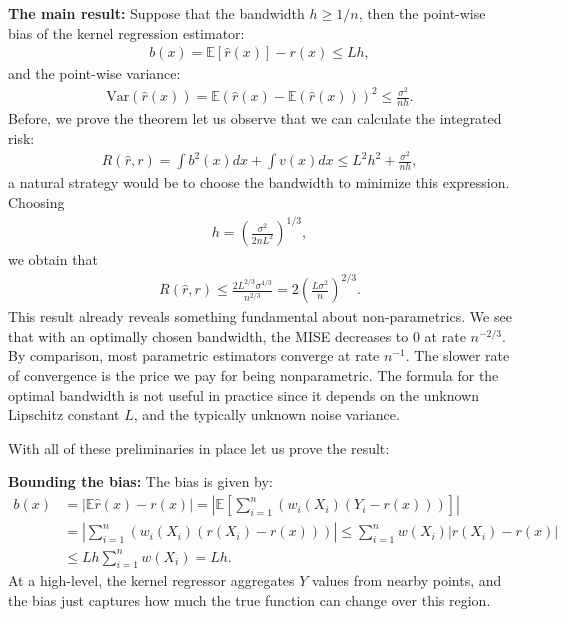 \documentclass[twoside,12pt]{article}
\begin{document}
{\bf The main result: } Suppose that the bandwidth $h \geq 1/n$, then the 
point-wise bias 
of the kernel regression estimator:
\begin{align*}
b(x) = \mathbb{E}[\widehat{r}(x)] - r(x) \leq Lh,
\end{align*}
and the point-wise variance:
\begin{align*}
\mathrm{Var}(\widehat{r}(x)) = \mathbb{E}( \widehat{r}(x) - \mathbb{E}(\widehat{r}(x)))^2 \leq
\frac{ \sigma^2 }{nh}. 
\end{align*}
Before, we prove the theorem let us observe that we can calculate the
integrated risk:
\begin{align*}
R(\widehat{r},r) = \int b^2(x) dx + \int v(x) dx \leq L^2 h^2 + \frac{ \sigma^2 }{nh},
\end{align*}
a natural strategy would be to choose the bandwidth to minimize this expression. Choosing
\begin{align*}
h = \left( \frac{  \sigma^2 }{2 n L^2} \right)^{1/3},
\end{align*}
we obtain that 
\begin{align*}
R(\widehat{r},r) \leq \frac{2 L^{2/3} \sigma^{4/3}}{n^{2/3}} = 2 \left( \frac{L \sigma^2}{n} \right)^{2/3}.
\end{align*}
This result already reveals something fundamental about non-parametrics.
We see that with an optimally chosen bandwidth, the MISE decreases to $0$ at rate 
$n^{-2/3}$. 
By comparison, most parametric estimators converge at rate $n^{-1}$. 
The slower rate of convergence is the price we pay for being nonparametric. The formula for the optimal bandwidth is not useful in practice since it depends on the unknown Lipschitz constant $L$,
and the typically unknown noise variance. 

With all of these preliminaries in place let us prove the result:

{\bf Bounding the bias: } The bias is given by:
\begin{align*}
b(x) &= | \mathbb{E} \widehat{r}(x) - r(x) | = \left \vert \mathbb{E} \left[ \sum_{i=1}^n (w_i(X_i) (Y_i - r(x))) \right] \right \vert \\
&= \left \vert  \sum_{i=1}^n (w_i(X_i) (r(X_i) - r(x))) \right \vert \leq \sum_{i=1}^n w(X_i) |r(X_i) - r(x)| \\
&\leq Lh \sum_{i=1}^n w(X_i) = Lh.
\end{align*}
At a high-level, the kernel regressor aggregates $Y$ values from nearby points, and the bias just captures how much the true function can change over this region. 
\end{document}
